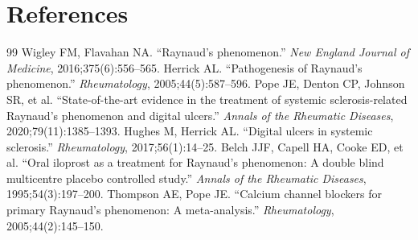 \section*{References}
\begin{thebibliography}{99}
 Wigley FM, Flavahan NA. ``Raynaud's phenomenon.'' \textit{New England Journal of Medicine}, 2016;375(6):556--565.
 Herrick AL. ``Pathogenesis of Raynaud's phenomenon.'' \textit{Rheumatology}, 2005;44(5):587--596.
 Pope JE, Denton CP, Johnson SR, et al. ``State-of-the-art evidence in the treatment of systemic sclerosis-related Raynaud's phenomenon and digital ulcers.'' \textit{Annals of the Rheumatic Diseases}, 2020;79(11):1385--1393.
 Hughes M, Herrick AL. ``Digital ulcers in systemic sclerosis.'' \textit{Rheumatology}, 2017;56(1):14--25.
 Belch JJF, Capell HA, Cooke ED, et al. ``Oral iloprost as a treatment for Raynaud's phenomenon: A double blind multicentre placebo controlled study.'' \textit{Annals of the Rheumatic Diseases}, 1995;54(3):197--200.
 Thompson AE, Pope JE. ``Calcium channel blockers for primary Raynaud's phenomenon: A meta-analysis.'' \textit{Rheumatology}, 2005;44(2):145--150.
\end{thebibliography}
